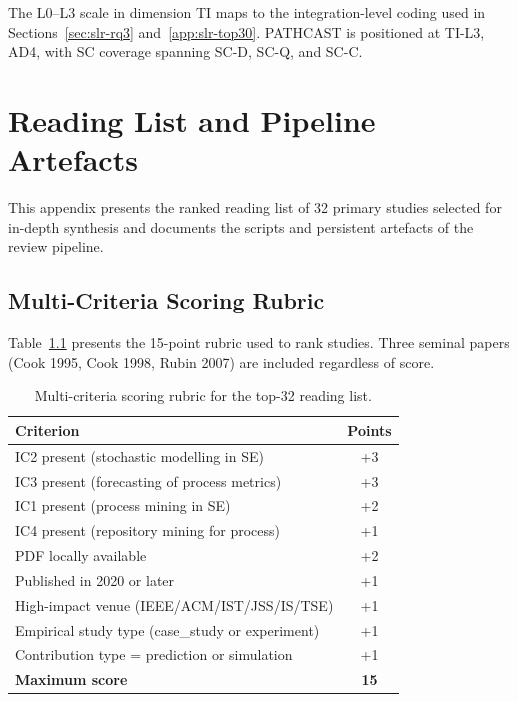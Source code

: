 The L0--L3 scale in dimension TI maps to the integration-level coding used
in Sections~\ref{sec:slr-rq3} and~\ref{app:slr-top30}. PATHCAST is positioned
at TI-L3, AD4, with SC coverage spanning SC-D, SC-Q, and SC-C.


\chapter{Reading List and Pipeline Artefacts}
\label{app:I}

This appendix presents the ranked reading list of 32 primary studies
selected for in-depth synthesis and documents the scripts and persistent
artefacts of the review pipeline.

\section{Multi-Criteria Scoring Rubric}
\label{app:slr-ranking-criteria}

Table~\ref{tab:app-ranking-criteria} presents the 15-point rubric used to
rank studies. Three seminal papers (Cook 1995, Cook 1998, Rubin 2007) are
included regardless of score.

\begin{table}[htbp]
\centering
\caption{Multi-criteria scoring rubric for the top-32 reading list.}
\label{tab:app-ranking-criteria}
\small
\setlength{\tabcolsep}{4pt}
\begin{tabular}{p{7.5cm} c}
\toprule
\textbf{Criterion} & \textbf{Points} \\
\midrule
IC2 present (stochastic modelling in SE)          & +3 \\
IC3 present (forecasting of process metrics)      & +3 \\
IC1 present (process mining in SE)                & +2 \\
IC4 present (repository mining for process)       & +1 \\
PDF locally available                             & +2 \\
Published in 2020 or later                        & +1 \\
High-impact venue (IEEE/ACM/IST/JSS/IS/TSE)      & +1 \\
Empirical study type (case\_study or experiment)  & +1 \\
Contribution type = prediction or simulation      & +1 \\
\midrule
\textbf{Maximum score}                            & \textbf{15} \\
\bottomrule
\end{tabular}
\end{table}

